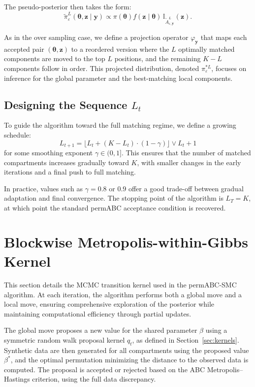 \documentclass[11pt,a4paper]{article}
\def\globparam{\beta}
\def\obsdata{\mathbf{y}}
\def\param{\boldsymbol{\theta}}
\def\proj{\varphi_{\obsdata}}
\def\simdata{\mathbf{z}}
\theoremstyle{plain}
\theoremstyle{definition}
\theoremstyle{remark}
\begin{document}
The pseudo-posterior then takes the form:
\[
\tilde{\pi}_\varepsilon^L(\param, \simdata \mid \obsdata) \propto \pi(\param) f(\simdata \mid \param) \, \mathbb{I}_{\tilde A_{\varepsilon, \obsdata}^{L}}(\simdata).
\]

As in the over sampling case, we define a projection operator \( \proj \) that maps each accepted pair \( (\param, \simdata) \) to a reordered version where the \( L \) optimally matched components are moved to the top \( L \) positions, and the remaining \( K - L \) components follow in order. This projected distribution, denoted \( \pi^{*L}_\varepsilon \), focuses on inference for the global parameter and the best-matching local components.

\subsection{Designing the Sequence \( L_t \)}

To guide the algorithm toward the full matching regime, we define a growing schedule:
\[
L_{t+1} = \lfloor L_t + (K - L_t) \cdot (1-\gamma) \rfloor \vee L_t + 1
\]
for some smoothing exponent \( \gamma \in (0, 1] \). This ensures that the number of matched compartments increases gradually toward \( K \), with smaller changes in the early iterations and a final push to full matching.

In practice, values such as \( \gamma = 0.8 \) or \( 0.9 \) offer a good trade-off between gradual adaptation and final convergence. The stopping point of the algorithm is \( L_T = K \), at which point the standard permABC acceptance condition is recovered.

\section{Blockwise Metropolis-within-Gibbs Kernel}
\label{appendix_kernel}

This section details the MCMC transition kernel used in the permABC-SMC algorithm. At each iteration, the algorithm performs both a global move and a local move, ensuring comprehensive exploration of the posterior while maintaining computational efficiency through partial updates.

The global move proposes a new value for the shared parameter \( \globparam \) using a symmetric random walk proposal kernel \( q_t \), as defined in Section~\ref{sec:kernels}. Synthetic data are then generated for all compartments using the proposed value \( \globparam^* \), and the optimal permutation minimizing the distance to the observed data is computed. The proposal is accepted or rejected based on the ABC Metropolis–Hastings criterion, using the full data discrepancy.
\end{document}
